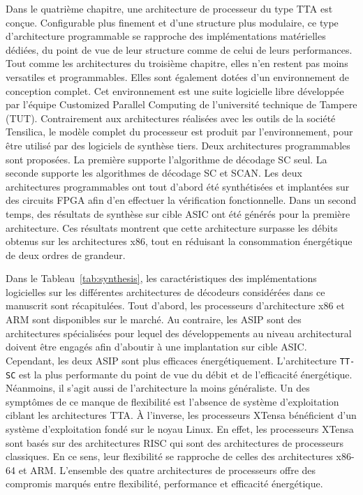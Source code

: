 Dans le quatrième chapitre, une architecture de processeur du type TTA est conçue. Configurable plus finement et d'une structure plus modulaire, ce type d'architecture programmable se rapproche des implémentations matérielles dédiées, du point de vue de leur structure comme de celui de leurs performances. Tout comme les architectures du troisième chapitre, elles n'en restent pas moins versatiles et programmables. Elles sont également dotées d'un environnement de conception complet. Cet environnement est une suite logicielle libre développée par l'équipe \og Customized Parallel Computing \fg de l'université technique de Tampere (TUT). Contrairement aux architectures réalisées avec les outils de la société Tensilica, le modèle complet du processeur est produit par l'environnement, pour être utilisé par des logiciels de synthèse tiers. Deux architectures programmables sont proposées. La première supporte l'algorithme de décodage SC seul. La seconde supporte les algorithmes de décodage SC et SCAN. Les deux architectures programmables ont tout d'abord été synthétisées et implantées sur des circuits FPGA afin d'en effectuer la vérification fonctionnelle. Dans un second temps, des résultats de synthèse sur cible ASIC ont été générés pour la première architecture. Ces résultats montrent que cette architecture surpasse les débits obtenus sur les architectures x86, tout en réduisant la consommation énergétique de deux ordres de grandeur.

Dans le Tableau~\ref{tab:synthesis}, les caractéristiques des implémentations logicielles sur les différentes architectures de décodeurs considérées dans ce manuscrit sont récapitulées. Tout d'abord, les processeurs d'architecture x86 et ARM sont disponibles sur le marché. Au contraire, les ASIP sont des architectures spécialisées pour lequel des développements au niveau architectural doivent être engagés afin d'aboutir à une implantation sur cible ASIC. Cependant, les deux ASIP sont plus efficaces énergétiquement. L'architecture \texttt{TT-SC} est la plus performante du point de vue du débit et de l'efficacité énergétique. Néanmoins, il s'agit aussi de l'architecture la moins généraliste. Un des symptômes de ce manque de flexibilité est l'absence de système d'exploitation ciblant les architectures TTA. \`A l'inverse, les processeurs XTensa bénéficient d'un système d'exploitation fondé sur le noyau Linux. En effet, les processeurs XTensa sont basés sur des architectures RISC qui sont des architectures de processeurs classiques. En ce sens, leur flexibilité se rapproche de celles des architectures x86-64 et ARM.
L'ensemble des quatre architectures de processeurs offre des compromis marqués entre flexibilité, performance et efficacité énergétique.

